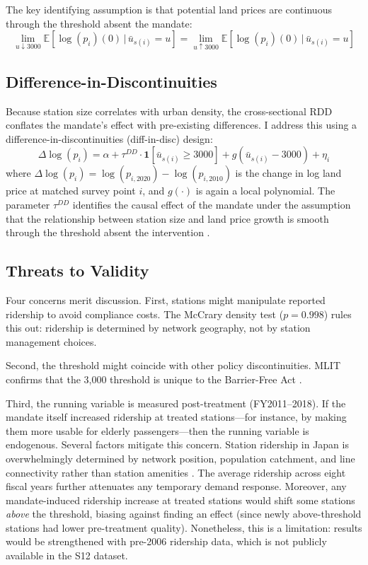 \documentclass[12pt]{article}
\newcommand{\E}{\mathbb{E}}
\begin{document}
The key identifying assumption is that potential land prices are continuous through the threshold absent the mandate:
\begin{equation}
\lim_{u \downarrow 3000} \E[\log(p_i)(0) \,|\, \bar{u}_{s(i)} = u] = \lim_{u \uparrow 3000} \E[\log(p_i)(0) \,|\, \bar{u}_{s(i)} = u]
\end{equation}

\subsection{Difference-in-Discontinuities}

Because station size correlates with urban density, the cross-sectional RDD conflates the mandate's effect with pre-existing differences. I address this using a difference-in-discontinuities (diff-in-disc) design:
\begin{equation}
\Delta \log(p_i) = \alpha + \tau^{DD} \cdot \mathbf{1}[\bar{u}_{s(i)} \geq 3000] + g(\bar{u}_{s(i)} - 3000) + \eta_i
\label{eq:did}
\end{equation}
where $\Delta \log(p_i) = \log(p_{i,2020}) - \log(p_{i,2010})$ is the change in log land price at matched survey point $i$, and $g(\cdot)$ is again a local polynomial. The parameter $\tau^{DD}$ identifies the causal effect of the mandate under the assumption that the relationship between station size and land price growth is smooth through the threshold absent the intervention \citep{grembi2016fiscal}.

\subsection{Threats to Validity}

Four concerns merit discussion. First, stations might manipulate reported ridership to avoid compliance costs. The McCrary density test ($p = 0.998$) rules this out: ridership is determined by network geography, not by station management choices.

Second, the threshold might coincide with other policy discontinuities. MLIT confirms that the 3,000 threshold is unique to the Barrier-Free Act \citep{mlit2020}.

Third, the running variable is measured post-treatment (FY2011--2018). If the mandate itself increased ridership at treated stations---for instance, by making them more usable for elderly passengers---then the running variable is endogenous. Several factors mitigate this concern. Station ridership in Japan is overwhelmingly determined by network position, population catchment, and line connectivity rather than station amenities \citep{sorensen2002making}. The average ridership across eight fiscal years further attenuates any temporary demand response. Moreover, any mandate-induced ridership increase at treated stations would shift some stations \textit{above} the threshold, biasing against finding an effect (since newly above-threshold stations had lower pre-treatment quality). Nonetheless, this is a limitation: results would be strengthened with pre-2006 ridership data, which is not publicly available in the S12 dataset.
\end{document}
